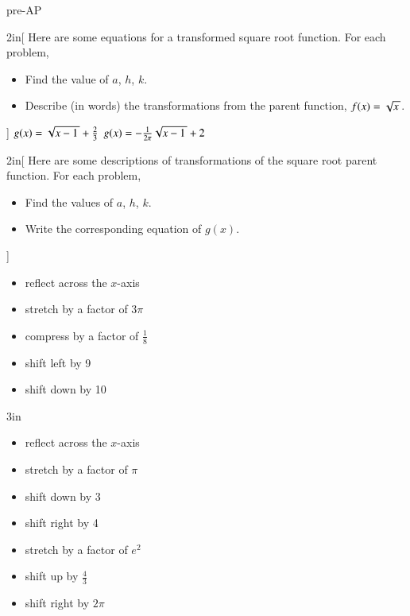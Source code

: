 \begin{taggedblock}{pre-AP}

\begin{my2Problems}[\normalsize]{2in}[%
    Here are some equations for a transformed square root function.
    For each problem,
    \vspace{-1em}
    \begin{itemize}[nosep]
        \item Find the value of $a$, $h$, $k$. 
        \item Describe (in words) the transformations from the parent function, $f(x)=\myRoot{x}$.
    \end{itemize}
    ]
    {
        $g(x) = \myRoot{x-1}+\frac{2}{3}$
    }
    {
        $g(x) = -\frac{1}{2\pi}\myRoot{x-1}+2$
    }
\end{my2Problems}
    



\newpage
\begin{my2Problems}[\normalsize]{2in}[%
    Here are some descriptions of transformations of the square root parent function.
    For each problem, 
    \vspace{-1em}
    \begin{itemize}[nosep]
        \item Find the values of $a$, $h$, $k$. 
        \item Write the corresponding equation of $g(x)$.
    \end{itemize}
    ]
    {
        \begin{itemize}[nosep]
            \item reflect across the $x$-axis
            \item stretch by a factor of $3\pi$
        \end{itemize}
    }
    {
        \begin{itemize}[nosep]
            \item compress by a factor of $\frac{1}{8}$
            \item shift left by 9
            \item shift down by 10
        \end{itemize}
    }
\end{my2Problems}
\begin{my2Problems}[\normalsize]{3in}
    {
        \begin{itemize}[nosep]
            \item reflect across the $x$-axis
            \item stretch by a factor of $\pi$
            \item shift down by 3
            \item shift right by 4
        \end{itemize}
    }
    {
        \begin{itemize}[nosep]
            \item stretch by a factor of $e^2$
            \item shift up by $\frac{4}{3}$
            \item shift right by $2\pi$
        \end{itemize}
    }
\end{my2Problems}


\end{taggedblock}


